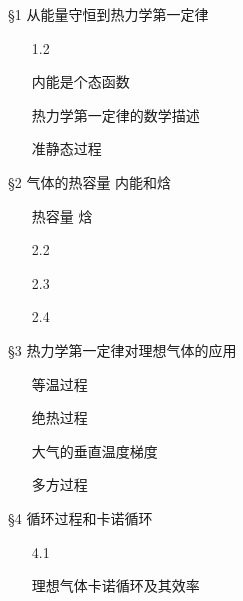 \documentclass[CJK]{beamer}
\begin{document}
\begin{frame}
\bch
{}


\begin{itemize}
\item[\cyantext{7.1}]{}
\item[\cyantext{7.2}]{}
\item[\greentext{7.3}]{}
\end{itemize}
\ech
\end{frame}


\begin{frame}
\bch
\S{1} 从能量守恒到热力学第一定律
\begin{itemize}
\item[\greentext{1.1}]{}
\item[1.2]{}
\item[\blacktext{1.3}]{内能是个态函数}
\item[\blacktext{1.4}]{热力学第一定律的数学描述}
\item[\blacktext{1.5}]{准静态过程}
\end{itemize}

\S{2} 气体的热容量 内能和焓
\begin{itemize}
\item[\blacktext{2.1}]{热容量 焓}
\item[2.2]{}
\item[2.3]{}
\item[2.4]{}
\item[\greentext{2.5}]{}
\end{itemize}

\ech
\end{frame}


\begin{frame}
\bch
\S{3} 热力学第一定律对理想气体的应用
\begin{itemize}
\item[\blacktext{3.1}]{等温过程}
\item[\blacktext{3.2}]{绝热过程}
\item[\blacktext{3.3}]{大气的垂直温度梯度}
\item[\blacktext{3.4}]{多方过程}
\end{itemize}

\S{4} 循环过程和卡诺循环
\begin{itemize}
\item[4.1]{}
\item[\blacktext{4.2}]{理想气体卡诺循环及其效率}
\end{itemize}

\ech
\end{frame}
\end{document}
